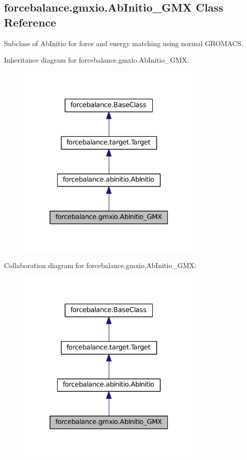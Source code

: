 \hypertarget{classforcebalance_1_1gmxio_1_1AbInitio__GMX}{\subsection{forcebalance.\-gmxio.\-Ab\-Initio\-\_\-\-G\-M\-X \-Class \-Reference}
\label{classforcebalance_1_1gmxio_1_1AbInitio__GMX}
}


\-Subclass of \-Ab\-Initio for force and energy matching using normal \-G\-R\-O\-M\-A\-C\-S.  




\-Inheritance diagram for forcebalance.\-gmxio.\-Ab\-Initio\-\_\-\-G\-M\-X\-:
\nopagebreak
\begin{figure}[H]
\begin{center}
\leavevmode
\includegraphics[width=254pt]{classforcebalance_1_1gmxio_1_1AbInitio__GMX__inherit__graph}
\end{center}
\end{figure}


\-Collaboration diagram for forcebalance.\-gmxio.\-Ab\-Initio\-\_\-\-G\-M\-X\-:
\nopagebreak
\begin{figure}[H]
\begin{center}
\leavevmode
\includegraphics[width=254pt]{classforcebalance_1_1gmxio_1_1AbInitio__GMX__coll__graph}
\end{center}
\end{figure}
